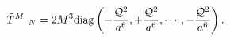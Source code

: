 \begin{equation}
\label{1eq15} \tilde T^M~_N =2M^3 {\rm diag}\left (
  -\frac{{\cal Q}^2}{a^{6}},  +\frac{{\cal Q}^2}{a^{6}},
  \cdots ,-\frac{{\cal Q}^2}{a^{6}} \right).
\end{equation}

